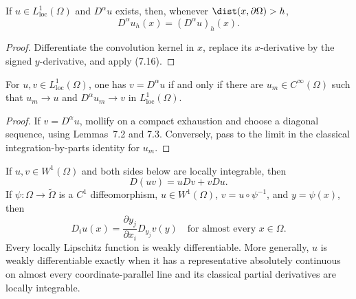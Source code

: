 \begin{lemma}
\label{gt:lem-sobolev-mollifier-derivative}
If $u\in L^1_{\mathrm{loc}}(\Omega)$ and $D^\alpha u$ exists, then, whenever
$\dist(x,\partial\Omega)>h$,
\begin{equation}
\tag{7.17}
D^\alpha u_h(x)=(D^\alpha u)_h(x).
\end{equation}
\end{lemma}
\begin{proof}
\sketch Differentiate the convolution kernel in $x$, replace its
$x$-derivative by the signed $y$-derivative, and apply (7.16).
\end{proof}

\begin{theorem}
\label{gt:thm-sobolev-weak-derivative-approx}
For $u,v\in L^1_{\mathrm{loc}}(\Omega)$, one has $v=D^\alpha u$ if and only
if there are $u_m\in C^\infty(\Omega)$ such that
$u_m\to u$ and $D^\alpha u_m\to v$ in $L^1_{\mathrm{loc}}(\Omega)$.
\end{theorem}
\begin{proof}
\sketch If $v=D^\alpha u$, mollify on a compact exhaustion and choose a
diagonal sequence, using Lemmas~7.2 and 7.3. Conversely, pass to the limit in
the classical integration-by-parts identity for $u_m$.
\end{proof}

\begin{proposition}
\label{gt:prop-sobolev-weak-calculus}
If $u,v\in W^1(\Omega)$ and both sides below are locally integrable, then
\begin{equation}
\tag{7.18}
D(uv)=uDv+vDu.
\end{equation}
If $\psi:\Omega\to\widetilde\Omega$ is a $C^1$ diffeomorphism,
$u\in W^1(\Omega)$, $v=u\circ\psi^{-1}$, and $y=\psi(x)$, then
\begin{equation}
\tag{7.19}
D_i u(x)=\frac{\partial y_j}{\partial x_i}D_{y_j}v(y)
\quad\text{for almost every }x\in\Omega.
\end{equation}
Every locally Lipschitz function is weakly differentiable. More generally,
$u$ is weakly differentiable exactly when it has a representative absolutely
continuous on almost every coordinate-parallel line and its classical partial
derivatives are locally integrable.
\end{proposition}

